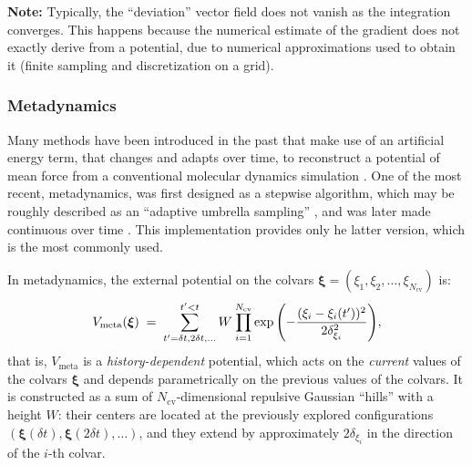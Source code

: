 \textbf{Note:} Typically, the ``deviation'' vector field does not
vanish as the integration converges. This happens because the
numerical estimate of the gradient does not exactly derive from a
potential, due to numerical approximations used to obtain it (finite
sampling and discretization on a grid).



\subsubsection{Metadynamics}
\label{sec:colvarbias_meta}

Many methods have been introduced in the past that make use of an
artificial energy term, that changes and adapts over time, to
reconstruct a potential of mean force from a conventional molecular
dynamics simulation \cite{Huber1994, Grubmuller1995, Voter1997,
  Darve2001, Laio2002, Hummer2003}.  One of the most recent,
metadynamics, was first designed as a stepwise algorithm, which may
be roughly described as an ``adaptive umbrella sampling''
\cite{Laio2002}, and was later made continuous over time
\cite{Iannuzzi2003}.  This implementation provides only he latter
version, which is the most commonly used.

In metadynamics, the external potential on the colvars $\bm{\xi} =
(\xi_{1}, \xi_{2}, \ldots, \xi_{N_{\mathrm{cv}}})$ is:
\begin{equation}
  \label{eq:colvars_meta_pot}
  V_{\mathrm{meta}}({\mbox{\boldmath{$\xi$}}}) \; = \; {
    \sum_{t' = \delta{}t, \\ 2\delta{}t, \\ \ldots}^{t'<t} W \: {
      \prod_{i = 1}^{N_{\mathrm{cv}}}
      \exp\left(-\frac{(\xi_{i}-\xi_{i}(t'))^{2}}{2\delta_{\xi_{i}}^{2}}\right)
    }
  }\mathrm{,}
\end{equation}
that is, $V_{\mathrm{meta}}$ is a \emph{history-dependent} potential,
which acts on the \emph{current} values of the colvars $\bm{\xi}$ and
depends parametrically on the previous values of the colvars.  It is
constructed as a sum of $N_{\mathrm{cv}}$-dimensional repulsive
Gaussian ``hills'' with a height $W$: their centers are located at the
previously explored configurations $\left(\bm{\xi}(\delta{}t),
  \bm{\xi}(2\delta{}t), \ldots\right)$, and they extend by
approximately $2\delta_{\xi_{i}}$ in the direction of the $i$-th
colvar.

